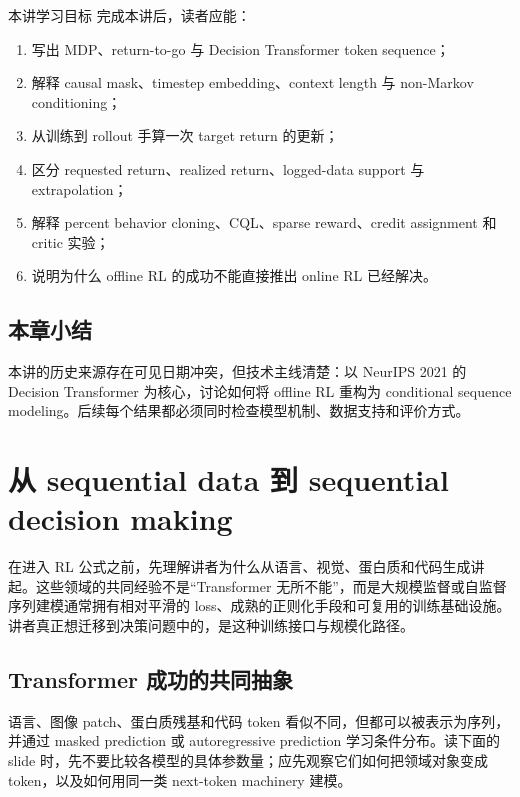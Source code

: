 \documentclass[a4paper]{article}
\begin{document}
\begin{importantbox}{本讲学习目标}
完成本讲后，读者应能：
\begin{enumerate}
  \item 写出 MDP、return-to-go 与 Decision Transformer token sequence；
  \item 解释 causal mask、timestep embedding、context length 与 non-Markov conditioning；
  \item 从训练到 rollout 手算一次 target return 的更新；
  \item 区分 requested return、realized return、logged-data support 与 extrapolation；
  \item 解释 percent behavior cloning、CQL、sparse reward、credit assignment 和 critic 实验；
  \item 说明为什么 offline RL 的成功不能直接推出 online RL 已经解决。
\end{enumerate}
\end{importantbox}

\subsection{本章小结}

本讲的历史来源存在可见日期冲突，但技术主线清楚：以 NeurIPS 2021 的 Decision Transformer 为核心，讨论如何将 offline RL 重构为 conditional sequence modeling。后续每个结果都必须同时检查模型机制、数据支持和评价方式。

\section{从 sequential data 到 sequential decision making}

在进入 RL 公式之前，先理解讲者为什么从语言、视觉、蛋白质和代码生成讲起。这些领域的共同经验不是“Transformer 无所不能”，而是大规模监督或自监督序列建模通常拥有相对平滑的 loss、成熟的正则化手段和可复用的训练基础设施。讲者真正想迁移到决策问题中的，是这种训练接口与规模化路径。

\subsection{Transformer 成功的共同抽象}

语言、图像 patch、蛋白质残基和代码 token 看似不同，但都可以被表示为序列，并通过 masked prediction 或 autoregressive prediction 学习条件分布。读下面的 slide 时，先不要比较各模型的具体参数量；应先观察它们如何把领域对象变成 token，以及如何用同一类 next-token machinery 建模。
\end{document}
